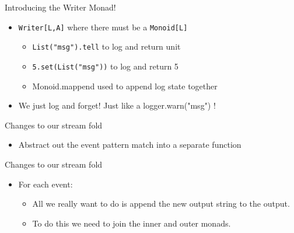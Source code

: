 \documentclass[professionalFonts,aspectratio=169]{beamer}
\begin{document}
\begin{frame}{Introducing the Writer Monad!}
\begin{itemize}
  \item \texttt{Writer[L,A]} where there must be a \texttt{Monoid[L]}
    \begin{itemize}
      \pause \item \texttt{List("msg").tell} to log and return unit
      \pause \item \texttt{5.set(List("msg"))} to log and return 5
      \pause \item Monoid.mappend used to append log state together
    \end{itemize}
  \pause \item We just log and forget! Just like a logger.warn("msg") !
\end{itemize}

\pause



\pause


\end{frame}

\begin{frame}{Changes to our stream fold}

\begin{itemize}
\item Abstract out the event pattern match into a separate function  
\end{itemize}

\pause



\end{frame}

\begin{frame}{Changes to our stream fold}

\begin{itemize}
\item For each event:
  \begin{itemize}
    \pause \item All we really want to do is append the new output string to the output.
    \pause \item To do this we need to join the inner and outer monads.
 \end{itemize}   
\end{itemize}

\pause



\end{frame}
\end{document}
